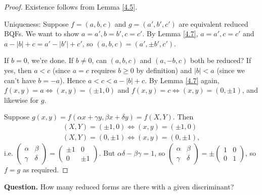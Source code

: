 \documentclass{article}
\theoremstyle{definition}
\begin{document}
\begin{proof}
    Existence follows from Lemma \ref{4.5}.

    Uniqueness: Suppose $f=(a,b,c)$ and $g=(a',b',c')$ are equivalent reduced BQFs. We want to show $a=a',b=b',c=c'$. By Lemma \ref{4.7}, $a=a',c=c'$ and $a-|b|+c = a' -|b'|+ c'$, so $(a,b,c)=(a',\pm b',c')$.
    \vspace{1mm}
    
    If $b=0$, we're done. If $b\neq 0$, can $(a,b,c)$ and $(a,-b,c)$ both be reduced? If yes, then $a<c$ (since $a=c$ requires $b\ge 0$ by definition) and $|b| <a$ (since we can't have $b=-a$). Hence $a < c < a - |b| + c$. By Lemma \ref{4.7} again, $f(x,y)=a \iff (x,y) = (\pm 1,0)$ and $f(x,y) = c \iff (x,y) = (0,\pm 1)$, and likewise for $g$.
    \vspace{1mm}
    
    Suppose $g(x,y) = f(\alpha x + \gamma y, \beta x + \delta y) = f(X,Y)$. Then 
    \begin{align*}
        (X,Y) = (\pm 1, 0) \iff (x,y) = (\pm 1, 0) \\
        (X,Y) = (0, \pm 1) \iff (x,y) = (0, \pm 1),
    \end{align*}
    i.e. $\begin{pmatrix} \alpha & \beta \\ \gamma & \delta \end{pmatrix} = \begin{pmatrix} \pm 1 & 0 \\ 0 & \pm 1 \end{pmatrix}$. But $\alpha \delta - \beta \gamma = 1$, so $\begin{pmatrix} \alpha & \beta \\ \gamma & \delta \end{pmatrix} = \pm \begin{pmatrix} 1 & 0 \\ 0 & 1 \end{pmatrix}$, so $f=g$ as required.
\end{proof}


\textbf{Question.} How many reduced forms are there with a given discriminant?
\end{document}
